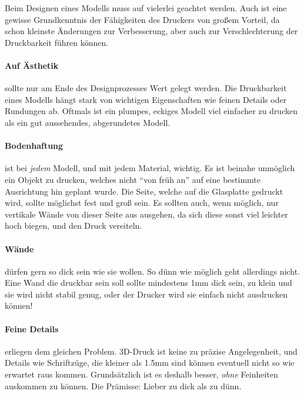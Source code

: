 Beim Designen eines Modells muss auf vielerlei geachtet werden. Auch ist eine gewisse Grundkenntnis der Fähigkeiten des Druckers von großem Vorteil, da schon kleinste Änderungen zur Verbesserung, aber auch zur Verschlechterung der Druckbarkeit führen können.

\paragraph{Auf Ästhetik} sollte nur am Ende des Designprozesses Wert gelegt werden. Die Druckbarkeit eines Modells hängt stark von wichtigen Eigenschaften wie feinen Details oder Rundungen ab. Oftmals ist ein plumpes, eckiges Modell viel einfacher zu drucken als ein gut aussehendes, abgerundetes Modell.

\paragraph{Bodenhaftung} ist bei \emph{jedem} Modell, und mit jedem Material, wichtig. Es ist beinahe unmöglich ein Objekt zu drucken, welches nicht "`von früh an"' auf eine bestimmte Ausrichtung hin geplant wurde.
Die Seite, welche auf die Glasplatte gedruckt wird, sollte möglichst fest und groß sein. Es sollten auch, wenn möglich, nur vertikale Wände von dieser Seite aus ausgehen, da sich diese sonst viel leichter hoch biegen, und den Druck vereiteln.

\paragraph{Wände} dürfen gern so dick sein wie sie wollen. So dünn wie möglich geht allerdings nicht. Eine Wand die druckbar sein soll sollte mindestens 1mm dick sein, zu klein und sie wird nicht stabil genug, oder der Drucker wird sie einfach nicht ausdrucken können!

\paragraph{Feine Details} erliegen dem gleichen Problem. 3D-Druck ist keine zu präzise Angelegenheit, und Details wie Schriftzüge, die kleiner als 1.5mm sind können eventuell nicht so wie erwartet raus kommen.
Grundsätzlich ist es deshalb besser, \emph{ohne} Feinheiten auskommen zu können. Die Prämisse: Lieber zu dick als zu dünn.


